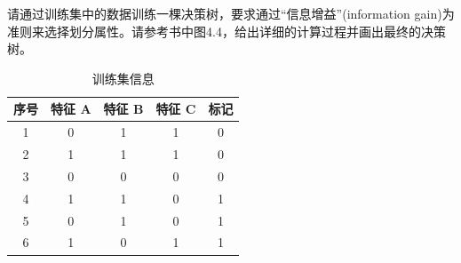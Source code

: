 \documentclass[a4paper,UTF8]{article}
\numberwithin{equation}{section}
\theoremstyle{definition}
\begin{document}
请通过训练集中的数据训练一棵决策树，要求通过“信息增益”(information gain)为准则来选择划分属性。请参考书中图4.4，给出详细的计算过程并画出最终的决策树。
\begin{table}[H]
\centering
\caption{训练集信息}
\label{table:training}\vspace{2mm} 
\begin{tabular}{c|c c c|c}\hline
序号		&  特征 \textbf{A} 	&	特征 \textbf{B}	&	特征 \textbf{C} 	&	标记    \\ \hline
1		&  0 	&	1	&	1 	&	0    \\
2		&  1 	&	1 	&	1 	&	0    \\
3		&  0 	&	0 	&	0 	&	0    \\
4		&  1 	&	1 	&	0 	&	1    \\
5		&  0 	&	1 	&	0 	&	1    \\
6		&  1 	&	0 	&	1 	&	1    \\\hline
\end{tabular} 
\end{table}
\end{document}

